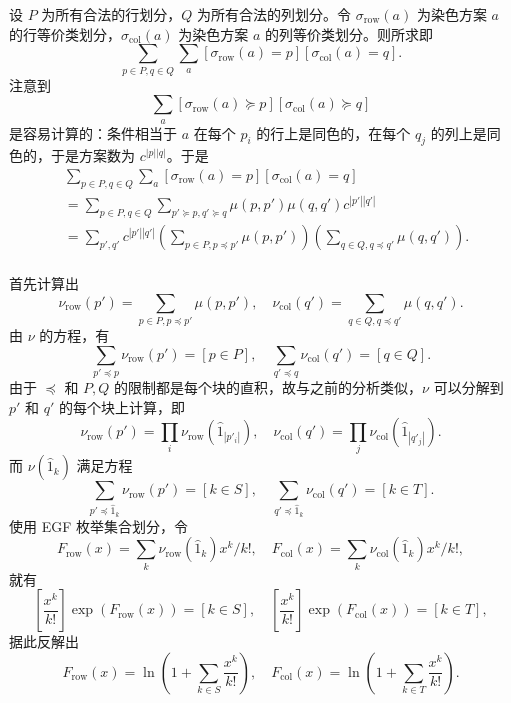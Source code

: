 \begin{solution}
    设 $P$ 为所有合法的行划分，$Q$ 为所有合法的列划分。令 $\sigma_{\mathrm{row}}(a)$ 为染色方案 $a$ 的行等价类划分，$\sigma_{\mathrm{col}}(a)$ 为染色方案 $a$ 的列等价类划分。则所求即
    $$
    \sum_{p\in P,q\in Q}\sum_a [\sigma_{\mathrm{row}}(a)=p][\sigma_{\mathrm{col}}(a)=q].
    $$
    注意到
    $$
    \sum_a [\sigma_{\mathrm{row}}(a)\succeq p][\sigma_{\mathrm{col}}(a)\succeq q]
    $$
    是容易计算的：条件相当于 $a$ 在每个 $p_i$ 的行上是同色的，在每个 $q_j$ 的列上是同色的，于是方案数为 $c^{|p||q|}$。于是
    $$
    \begin{aligned}
    &\sum_{p\in P,q\in Q}\sum_a [\sigma_{\mathrm{row}}(a)=p][\sigma_{\mathrm{col}}(a)=q]\\
    &=\sum_{p\in P,q\in Q}\sum_{p'\succeq p,q'\succeq q}\mu(p,p')\mu(q,q') c^{|p'||q'|}\\
    &=\sum_{p',q'}c^{|p'||q'|}\left(\sum_{p\in P,p\preceq p'}\mu(p,p')\right)\left(\sum_{q\in Q,q\preceq q'}\mu(q,q')\right).\\
    \end{aligned}
    $$

    首先计算出
    $$
    \nu_{\mathrm{row}}(p')=\sum_{p\in P,p\preceq p'}\mu(p,p'),\quad \nu_{\mathrm{col}}(q')=\sum_{q\in Q,q\preceq q'}\mu(q,q').
    $$
    由 $\nu$ 的方程，有
    $$
    \sum_{p'\preceq p}\nu_{\mathrm{row}}(p')=[p\in P],\quad \sum_{q'\preceq q}\nu_{\mathrm{col}}(q')=[q\in Q].
    $$
    由于 $\preceq$ 和 $P,Q$ 的限制都是每个块的直积，故与之前的分析类似，$\nu$ 可以分解到 $p'$ 和 $q'$ 的每个块上计算，即
    $$
    \nu_{\mathrm{row}}(p')=\prod_i \nu_{\mathrm{row}}(\hat 1_{|p'_i|}),\quad \nu_{\mathrm{col}}(q')=\prod_j \nu_{\mathrm{col}}(\hat 1_{|q'_j|}).
    $$
    而 $\nu(\hat 1_k)$ 满足方程
    $$
    \sum_{p'\preceq \hat 1_k}\nu_{\mathrm{row}}(p')=[k\in S],\quad \sum_{q'\preceq \hat 1_k}\nu_{\mathrm{col}}(q')=[k\in T].
    $$
    使用 EGF 枚举集合划分，令
    $$
    F_{\mathrm{row}}(x)=\sum_k \nu_{\mathrm{row}}(\hat 1_k)x^k/k!,\quad F_{\mathrm{col}}(x)=\sum_k \nu_{\mathrm{col}}(\hat 1_k)x^k/k!,
    $$
    就有
    $$
    \left[\frac{x^k}{k!}\right]\exp(F_{\mathrm{row}}(x))=[k\in S],\quad \left[\frac{x^k}{k!}\right]\exp(F_{\mathrm{col}}(x))=[k\in T],
    $$
    据此反解出 
    $$
    F_{\mathrm{row}}(x)=\ln\left(1+\sum_{k\in S}\frac{x^k}{k!}\right),\quad F_{\mathrm{col}}(x)=\ln\left(1+\sum_{k\in T}\frac{x^k}{k!}\right).
    $$
    

\end{solution}
